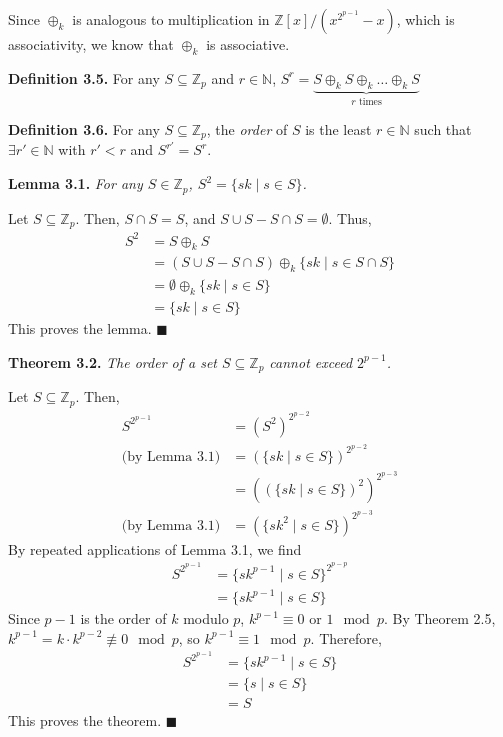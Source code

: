 \documentclass{article}
\newcommand{\zee}{\mathbb{Z}}
\newcommand{\N}{\mathbb{N}}
\begin{document}
Since $\oplus_k$ is analogous to multiplication in
$\zee[x]/(x^{2^{p-1}} - x)$, which is associativity,
we know that $\oplus_k$ is associative.

\textbf{Definition 3.5.} For any $S \subseteq \zee_p$ and $r \in \N$,
$S^r = \underbrace{S \oplus_k S \oplus_k \ldots \oplus_k S}
_{r\text{ times}}$

\textbf{Definition 3.6.} For any $S \subseteq \zee_p$, the \textit{order}
of $S$ is the least $r \in \N$ such that $\exists r' \in \N$ with
$r' < r$ and $S^{r'} = S^r$.

\textbf{Lemma 3.1.} \textit{For any $S \in \zee_p$,
$S^2 = \{sk \mid s \in S\}$.}

Let $S \subseteq \zee_p$.
Then, $S \cap S = S$, and $S \cup S - S \cap S = \emptyset$.
Thus,
\[\begin{split}
S^2 &= S \oplus_k S \\
&= (S \cup S - S \cap S) \oplus_k \{sk \mid s \in S \cap S\} \\
&= \emptyset \oplus_k \{sk \mid s \in S\} \\
&= \{sk \mid s \in S\}
\end{split}\]
This proves the lemma. $\blacksquare$

\textbf{Theorem 3.2.} \textit{The order of a set
$S \subseteq \zee_p$ cannot exceed $2^{p-1}$.}

Let $S \subseteq \zee_p$.
Then,
\[\begin{split}
    S^{2^{p-1}} &= (S^2)^{2^{p-2}} \\
    \text{(by Lemma 3.1)} &= (\{sk \mid s \in S\})^{2^{p-2}} \\
    &= ((\{sk \mid s \in S\})^2)^{2^{p-3}} \\
    \text{(by Lemma 3.1)} &= (\{sk^2 \mid s \in S\})^{2^{p-3}}
\end{split}\]
By repeated applications of Lemma 3.1, we find
\[\begin{split}
    S^{2^{p-1}} &= \{sk^{p-1} \mid s \in S\}^{2^{p-p}} \\
    &= \{sk^{p-1} \mid s \in S\}
\end{split}\]
Since $p-1$ is the order of $k$ modulo $p$, $k^{p-1} \equiv 0$
or $1 \mod p$.
By Theorem 2.5, $k^{p-1} = k \cdot k^{p-2} \not\equiv 0 \mod p$, so
$k^{p-1} \equiv 1 \mod p$. Therefore,
\[\begin{split}
    S^{2^{p-1}} &= \{sk^{p-1} \mid s \in S\} \\
    &= \{s \mid s \in S\} \\
    &= S
\end{split}\]
This proves the theorem. $\blacksquare$
\end{document}
